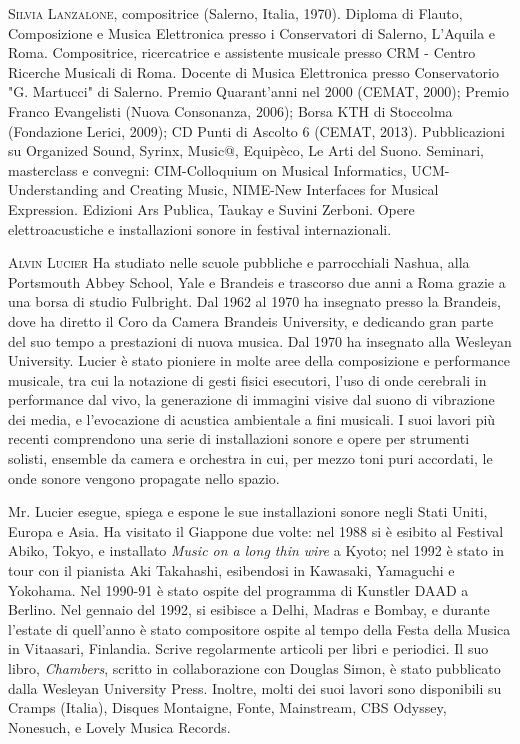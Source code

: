 \documentclass[9pt, twoside, a5paper]{extreport}
\newcommand{\biografia}[2]{%
\noindent \textsc{#1} %
#2 %
\medskip
}%
\begin{document}
\begin{multicols}{2}

\biografia{Silvia Lanzalone,}{compositrice (Salerno, Italia, 1970). Diploma di Flauto, Composizione e Musica Elettronica presso i Conservatori di Salerno, L’Aquila e Roma. Compositrice, ricercatrice e assistente musicale presso CRM - Centro Ricerche Musicali di Roma. Docente di Musica Elettronica presso Conservatorio "G. Martucci" di Salerno. Premio Quarant’anni nel 2000 (CEMAT, 2000); Premio Franco Evangelisti (Nuova Consonanza, 2006); Borsa KTH di Stoccolma (Fondazione Lerici, 2009); CD Punti di Ascolto 6 (CEMAT, 2013). Pubblicazioni su Organized Sound, Syrinx, Music@, Equipèco, Le Arti del Suono. Seminari, masterclass e convegni: CIM-Colloquium on Musical Informatics, UCM-Understanding and Creating Music, NIME-New Interfaces for Musical Expression. Edizioni Ars Publica, Taukay e Suvini Zerboni. Opere elettroacustiche e installazioni sonore in festival internazionali.}

\biografia{Alvin Lucier}{Ha studiato nelle scuole pubbliche e parrocchiali Nashua, alla Portsmouth Abbey School, Yale e Brandeis e trascorso due anni a Roma grazie a una borsa di studio Fulbright. Dal 1962 al 1970 ha insegnato presso la Brandeis, dove ha diretto il Coro da Camera Brandeis University, e dedicando gran parte del suo tempo a prestazioni di nuova musica. Dal 1970 ha insegnato alla Wesleyan University. Lucier è stato pioniere in molte aree della composizione e performance musicale, tra cui la notazione di gesti fisici esecutori, l'uso di onde cerebrali in performance dal vivo, la generazione di immagini visive dal suono di vibrazione dei media, e l'evocazione di acustica ambientale a fini musicali. I suoi lavori più recenti comprendono una serie di installazioni sonore e opere per strumenti solisti, ensemble da camera e orchestra in cui, per mezzo toni puri accordati, le onde sonore vengono propagate nello spazio. 

Mr. Lucier esegue, spiega e espone le sue installazioni sonore negli Stati Uniti, Europa e Asia. Ha visitato il Giappone due volte: nel 1988 si è esibito al Festival Abiko, Tokyo, e installato \textit{Music on a long thin wire} a Kyoto; nel 1992 è stato in tour con il pianista Aki Takahashi, esibendosi in Kawasaki, Yamaguchi e Yokohama. Nel 1990-91 è stato ospite del programma di Kunstler DAAD a Berlino. Nel gennaio del 1992, si esibisce a Delhi, Madras e Bombay, e durante l'estate di quell'anno è stato compositore ospite al tempo della Festa della Musica in Vitaasari, Finlandia. Scrive regolarmente articoli per libri e periodici. Il suo libro, \textit{Chambers}, scritto in collaborazione con Douglas Simon, è stato pubblicato dalla Wesleyan University Press. Inoltre, molti dei suoi lavori sono disponibili su Cramps (Italia), Disques Montaigne, Fonte, Mainstream, CBS Odyssey, Nonesuch, e Lovely Musica Records. 

}
\end{multicols}
\end{document}
